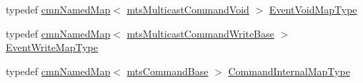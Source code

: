 \begin{DoxyCompactItemize}
\item 
typedef \hyperlink{classcmn_named_map}{cmn\+Named\+Map}$<$ \hyperlink{classmts_multicast_command_void}{mts\+Multicast\+Command\+Void} $>$ \hyperlink{classmts_interface_provided_a81dc5f40eef8155cfc0ddad74c5c1b6a}{Event\+Void\+Map\+Type}
\item 
typedef \hyperlink{classcmn_named_map}{cmn\+Named\+Map}$<$ \hyperlink{classmts_multicast_command_write_base}{mts\+Multicast\+Command\+Write\+Base} $>$ \hyperlink{classmts_interface_provided_a98f1388a3c2119a1ae97f19302eeb550}{Event\+Write\+Map\+Type}
\item 
typedef \hyperlink{classcmn_named_map}{cmn\+Named\+Map}$<$ \hyperlink{classmts_command_base}{mts\+Command\+Base} $>$ \hyperlink{classmts_interface_provided_afbea756c205cd50db2a0884681ad650a}{Command\+Internal\+Map\+Type}
\end{DoxyCompactItemize}

